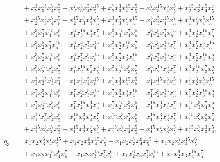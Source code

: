 \documentclass[reqno]{amsart}
\theoremstyle{plain}
\theoremstyle{definition}
\theoremstyle{plain}
\theoremstyle{definition}
\numberwithin{equation}{section}
\begin{document}
\begin{align*}
&\quad + x_2^{3}x_3^{15}x_4^{7}x_5^{5} + x_2^{7}x_3^{3}x_4^{5}x_5^{15} + x_2^{7}x_3^{3}x_4^{15}x_5^{5} + x_2^{7}x_3^{15}x_4^{3}x_5^{5} + x_2^{15}x_3^{3}x_4^{5}x_5^{7}\\ 
&\quad + x_2^{15}x_3^{3}x_4^{7}x_5^{5} + x_2^{15}x_3^{7}x_4^{3}x_5^{5} + x_1^{3}x_3^{5}x_4^{7}x_5^{15} + x_1^{3}x_3^{5}x_4^{15}x_5^{7} + x_1^{3}x_3^{7}x_4^{5}x_5^{15}\\ 
&\quad + x_1^{3}x_3^{7}x_4^{15}x_5^{5} + x_1^{3}x_3^{15}x_4^{5}x_5^{7} + x_1^{3}x_3^{15}x_4^{7}x_5^{5} + x_1^{3}x_2^{5}x_4^{7}x_5^{15} + x_1^{3}x_2^{5}x_4^{15}x_5^{7}\\ 
&\quad + x_1^{3}x_2^{5}x_3^{7}x_5^{15} + x_1^{3}x_2^{5}x_3^{7}x_4^{15} + x_1^{3}x_2^{5}x_3^{15}x_5^{7} + x_1^{3}x_2^{5}x_3^{15}x_4^{7} + x_1^{3}x_2^{7}x_4^{5}x_5^{15}\\ 
&\quad + x_1^{3}x_2^{7}x_4^{15}x_5^{5} + x_1^{3}x_2^{7}x_3^{5}x_5^{15} + x_1^{3}x_2^{7}x_3^{5}x_4^{15} + x_1^{3}x_2^{7}x_3^{15}x_5^{5} + x_1^{3}x_2^{7}x_3^{15}x_4^{5}\\ 
&\quad + x_1^{3}x_2^{15}x_4^{5}x_5^{7} + x_1^{3}x_2^{15}x_4^{7}x_5^{5} + x_1^{3}x_2^{15}x_3^{5}x_5^{7} + x_1^{3}x_2^{15}x_3^{5}x_4^{7} + x_1^{3}x_2^{15}x_3^{7}x_5^{5}\\ 
&\quad + x_1^{3}x_2^{15}x_3^{7}x_4^{5} + x_1^{7}x_3^{3}x_4^{5}x_5^{15} + x_1^{7}x_3^{3}x_4^{15}x_5^{5} + x_1^{7}x_3^{15}x_4^{3}x_5^{5} + x_1^{7}x_2^{3}x_4^{5}x_5^{15}\\ 
&\quad + x_1^{7}x_2^{3}x_4^{15}x_5^{5} + x_1^{7}x_2^{3}x_3^{5}x_5^{15} + x_1^{7}x_2^{3}x_3^{5}x_4^{15} + x_1^{7}x_2^{3}x_3^{15}x_5^{5} + x_1^{7}x_2^{3}x_3^{15}x_4^{5}\\ 
&\quad + x_1^{7}x_2^{15}x_4^{3}x_5^{5} + x_1^{7}x_2^{15}x_3^{3}x_5^{5} + x_1^{7}x_2^{15}x_3^{3}x_4^{5} + x_1^{15}x_3^{3}x_4^{5}x_5^{7} + x_1^{15}x_3^{3}x_4^{7}x_5^{5}\\ 
&\quad + x_1^{15}x_3^{7}x_4^{3}x_5^{5} + x_1^{15}x_2^{3}x_4^{5}x_5^{7} + x_1^{15}x_2^{3}x_4^{7}x_5^{5} + x_1^{15}x_2^{3}x_3^{5}x_5^{7} + x_1^{15}x_2^{3}x_3^{5}x_4^{7}\\ 
&\quad + x_1^{15}x_2^{3}x_3^{7}x_5^{5} + x_1^{15}x_2^{3}x_3^{7}x_4^{5} + x_1^{15}x_2^{7}x_4^{3}x_5^{5} + x_1^{15}x_2^{7}x_3^{3}x_5^{5} + x_1^{15}x_2^{7}x_3^{3}x_4^{5},\\
q_3 &= x_1x_2x_3^{6}x_4^{7}x_5^{15} + x_1x_2x_3^{6}x_4^{15}x_5^{7} + x_1x_2x_3^{7}x_4^{6}x_5^{15} + x_1x_2x_3^{7}x_4^{15}x_5^{6}\\ 
&\quad + x_1x_2x_3^{15}x_4^{6}x_5^{7} + x_1x_2x_3^{15}x_4^{7}x_5^{6} + x_1x_2^{6}x_3x_4^{7}x_5^{15} + x_1x_2^{6}x_3x_4^{15}x_5^{7}\\ 

\end{align*}
\end{document}
